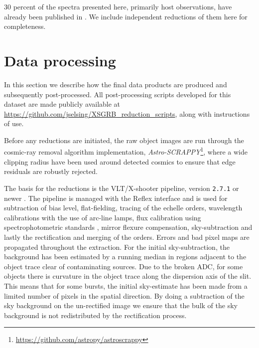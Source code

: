 \documentclass{aa}    %
\begin{document}
30 percent of the spectra presented here, primarily host observations, have
already been published in \citet{Kruhler2015}. We include independent
reductions of them here for completeness.

\section{Data processing} \label{proc}

In this section we describe how the final data products are produced and
subsequently post-processed. %
All post-processing scripts developed for this dataset are made publicly
available at \url{https://github.com/jselsing/XSGRB_reduction_scripts}, along
with instructions of use.

Before any reductions are initiated, the raw object images are run through the
cosmic-ray removal algorithm \citep{VanDokkum2001} implementation,
\textit{Astro-SCRAPPY}\footnote{\url{https://github.com/astropy/astroscrappy}},
where a wide clipping radius have been used around detected cosmics to ensure that edge residuals are
robustly rejected. 

The basis for the reductions is the VLT/X-shooter pipeline, version
\texttt{2.7.1} or newer \citep{Goldoni2006, Modigliani2010}. The pipeline is
managed with the Reflex interface \citep{Freudling2013} and is used for
subtraction of bias level, flat-fielding, tracing of the echelle orders,
wavelength calibrations with the use of arc-line lamps, flux calibration using
spectrophotometric standards \citep{Vernet2010, Hamuy1994}, mirror flexure
compensation, sky-subtraction and lastly the rectification and merging
of the orders. Errors and bad pixel maps are propagated throughout the
extraction. For the initial sky-subtraction, the background has been estimated
by a running median in regions adjacent to the object trace clear of
contaminating sources. Due to the broken ADC, for some objects there is
curvature in the object trace along the dispersion axis of the slit. This means
that for some bursts, the initial sky-estimate has been made from a limited
number of pixels in the spatial direction. By doing a subtraction of
the sky background on the un-rectified image we ensure that the bulk of the sky
background is not redistributed by the rectification process.
\end{document}
